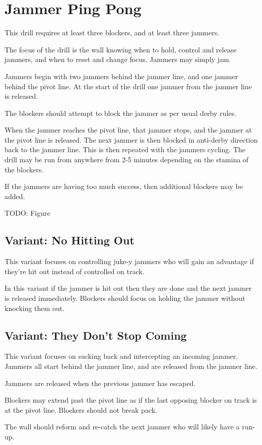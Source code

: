 \section{Jammer Ping Pong}
\label{sec:three_wall/ping_pong}

This drill requires at least three blockers, and at least three jammers.

The focus of the drill is the wall knowing when to hold, control and release jammers, and when to reset and change focus. 
Jammers may simply jam.


Jammers begin with two jammers behind the jammer line, and one jammer behind the pivot line.
At the start of the drill one jammer from the jammer line is released.

The blockers should attempt to block the jammer as per usual derby rules.

When the jammer reaches the pivot line, that jammer stops, and the jammer at the pivot line is released. 
The next jammer is then blocked in anti-derby direction back to the jammer line.
This is then repeated with the jammers cycling. 
The drill may be run from anywhere from 2-5 minutes depending on the stamina of the blockers. 

If the jammers are having too much success, then additional blockers may be added.


{\color{red} TODO: Figure}

\subsection*{Variant: No Hitting Out}  
\label{sec:three_wall/ping_pong/no_hitting_out}

This variant focuses on controlling juke-y jammers who will gain an advantage if they're hit out instead of controlled on track.  

In this variant if the jammer is hit out then they are done and the next jammer is released immediately.
Blockers should focus on holding the jammer without knocking them out. 


\subsection*{Variant: They Don't Stop Coming} 
\label{sec:three_wall/ping_pong/dont_stop}

This variant focuses on sucking back and intercepting an incoming jammer.
Jammers all start behind the jammer line, and are released from the jammer line. 

Jammers are released when the previous jammer has escaped.

Blockers may extend past the pivot line as if the last opposing blocker on track is at the pivot line. Blockers should not break pack. 

The wall should reform and re-catch the next jammer who will likely have a run-up.  
